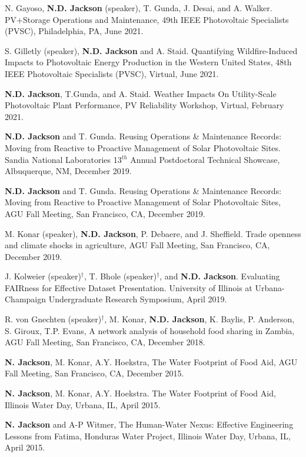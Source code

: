 \documentclass{article}[12pt]
\begin{document}
\begin{etaremune}[]
		\item N. Gayoso, \textbf{N.D. Jackson} (speaker), T. Gunda, J. Desai, and A. Walker. PV+Storage Operations and Maintenance, 49th IEEE Photovoltaic Specialists (PVSC), Philadelphia, PA, June 2021.
		
		\item S. Gilletly (speaker), \textbf{N.D. Jackson} and A. Staid. Quantifying Wildfire-Induced Impacts to Photovoltaic Energy Production in the Western United States, 48th IEEE Photovoltaic Specialists (PVSC), Virtual, June 2021.
		
		\item \textbf{N.D. Jackson}, T.Gunda, and A. Staid. Weather Impacts On Utility-Scale Photovoltaic Plant Performance, PV Reliability Workshop, Virtual,  February 2021. 
		
		\item \textbf{N.D. Jackson} and T. Gunda.  Reusing Operations \& Maintenance Records: Moving from Reactive to Proactive Management of Solar Photovoltaic Sites. Sandia National Laboratories 13$^{th}$ Annual Postdoctoral Technical Showcase, Albuquerque, NM, December 2019.
		
		\item \textbf{N.D. Jackson} and T. Gunda.  Reusing Operations \& Maintenance Records: Moving from Reactive to Proactive Management of Solar Photovoltaic Sites, AGU Fall Meeting, San Francisco, CA, December 2019.  
		
		\item M. Konar (speaker), \textbf{N.D. Jackson}, P. Debaere, and J. Sheffield. Trade openness and climate shocks in agriculture, AGU Fall Meeting, San Francisco, CA, December 2019.  
		
		\item J. Kolweier (speaker)$^{\dagger}$, T. Bhole (speaker)$^{\dagger}$, and \textbf{N.D. Jackson}. Evaluating FAIRness for Effective Dataset Presentation. University of Illinois at Urbana-Champaign Undergraduate Research Symposium, April 2019. 
		
		\item R. von Gnechten (speaker)$^{\dagger}$, M. Konar, \textbf{N.D. Jackson}, K. Baylis, P. Anderson, S. Giroux, T.P. Evans, A network analysis of household food sharing in Zambia, AGU Fall Meeting, San Francisco, CA, December 2018. 
		
		\item \textbf{N. Jackson}, M. Konar, A.Y. Hoekstra, The Water Footprint of Food Aid, AGU Fall Meeting, San Francisco, CA, December 2015.
		
		\item \textbf{N. Jackson}, M. Konar, A.Y. Hoekstra. The Water Footprint of Food Aid, Illinois Water Day, Urbana, IL, April 2015. 
		
		\item \textbf{N. Jackson} and A-P Witmer, The Human-Water Nexus: Effective Engineering Lessons from Fatima, Honduras Water Project, Illinois Water Day, Urbana, IL, April 2015. 
		
		
	\end{etaremune}
	
\end{document}
